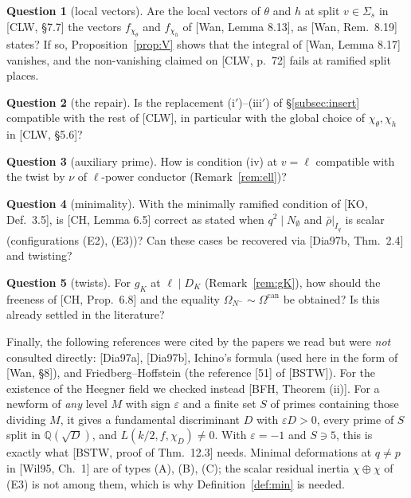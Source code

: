 \documentclass[11pt]{amsart}
\theoremstyle{definition}
\newtheorem{question}{Question}
\theoremstyle{remark}
\newcommand{\Q}{\mathbb{Q}}
\begin{document}
\begin{question}[local vectors]\label{q:L1}
Are the local vectors of $\theta$ and $h$ at split $v\in\Sigma_s$ in [CLW, \S 7.7] the vectors $f_{\chi_\theta}$ and $f_{\chi_h}$ of [Wan, Lemma 8.13], as [Wan, Rem.~8.19] states? If so, Proposition~\ref{prop:V} shows that the integral of [Wan, Lemma 8.17] vanishes, and the non-vanishing claimed on [CLW, p.~72] fails at ramified split places.
\end{question}
\begin{question}[the repair]
Is the replacement (i$'$)--(iii$'$) of \S\ref{subsec:insert} compatible with the rest of [CLW], in particular with the global choice of $\chi_\theta,\chi_h$ in [CLW, \S5.6]?
\end{question}
\begin{question}[auxiliary prime]\label{q:ell}
How is condition (iv) at $v=\ell$ compatible with the twist by $\nu$ of $\ell$-power conductor (Remark~\ref{rem:ell})?
\end{question}
\begin{question}[minimality]
With the minimally ramified condition of [KO, Def.~3.5], is [CH, Lemma 6.5] correct as stated when $q^2\mid N_\emptyset$ and $\bar\rho|_{I_q}$ is scalar (configurations (E2), (E3))? Can these cases be recovered via [Dia97b, Thm.~2.4] and twisting?
\end{question}
\begin{question}[twists]
For $g_K$ at $\ell\mid D_K$ (Remark~\ref{rem:gK}), how should the freeness of [CH, Prop.~6.8] and the equality $\Omega_{N^-}\sim\Omega^{\mathrm{can}}$ be obtained? Is this already settled in the literature?
\end{question}

\noindent Finally, the following references were cited by the papers we read but were \emph{not} consulted directly: [Dia97a], [Dia97b], Ichino's formula (used here in the form of [Wan, \S8]), and Friedberg--Hoffstein (the reference [51] of [BSTW]). For the existence of the Heegner field we checked instead [BFH, Theorem (ii)]. For a newform of \emph{any} level $M$ with sign $\varepsilon$ and a finite set $S$ of primes containing those dividing $M$, it gives a fundamental discriminant $D$ with $\varepsilon D>0$, every prime of $S$ split in $\Q(\sqrt D)$, and $L(k/2,f,\chi_D)\neq0$. With $\varepsilon=-1$ and $S\ni5$, this is exactly what [BSTW, proof of Thm.~12.3] needs. Minimal deformations at $q\neq p$ in [Wil95, Ch.~1] are of types (A), (B), (C); the scalar residual inertia $\chi\oplus\chi$ of (E3) is not among them, which is why Definition~\ref{def:min} is needed.
\end{document}
